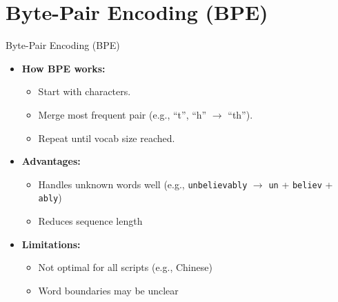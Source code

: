 \section{Byte-Pair Encoding (BPE)}
\begin{frame}{Byte-Pair Encoding (BPE)}
    \begin{itemize}
        \item \textbf{How BPE works:}
        \begin{itemize}
            \item Start with characters.
            \item Merge most frequent pair (e.g., ``t'', ``h'' $\rightarrow$ ``th'').
            \item Repeat until vocab size reached.
        \end{itemize}
        \item \textbf{Advantages:}
        \begin{itemize}
            \item Handles unknown words well (e.g., \texttt{unbelievably} $\rightarrow$ \texttt{un} + \texttt{believ} + \texttt{ably})
            \item Reduces sequence length
        \end{itemize}
        \item \textbf{Limitations:}
        \begin{itemize}
            \item Not optimal for all scripts (e.g., Chinese)
            \item Word boundaries may be unclear
        \end{itemize}
    \end{itemize}
\end{frame}